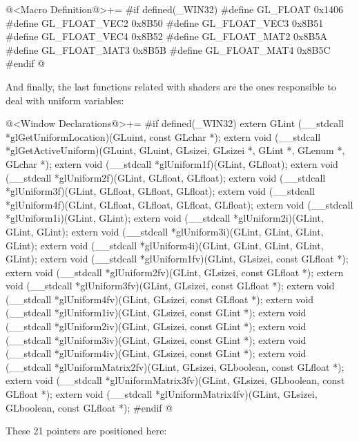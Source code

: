 \iniciocodigo
@<Macro Definition@>+=
#if defined(_WIN32)
#define GL_FLOAT      0x1406
#define GL_FLOAT_VEC2 0x8B50
#define GL_FLOAT_VEC3 0x8B51
#define GL_FLOAT_VEC4 0x8B52
#define GL_FLOAT_MAT2 0x8B5A
#define GL_FLOAT_MAT3 0x8B5B
#define GL_FLOAT_MAT4 0x8B5C
#endif
@
\fimcodigo

And finally, the last functions related with shaders are the ones
responsible to deal with uniform variables:

\iniciocodigo
@<Window Declarations@>+=
#if defined(_WIN32)
extern GLint (__stdcall *glGetUniformLocation)(GLuint, const GLchar *);
extern void (__stdcall *glGetActiveUniform)(GLuint, GLuint, GLsizei, GLsizei *,
                                            GLint *, GLenum *, GLchar *);
extern void (__stdcall *glUniform1f)(GLint, GLfloat);
extern void (__stdcall *glUniform2f)(GLint, GLfloat, GLfloat);
extern void (__stdcall *glUniform3f)(GLint, GLfloat, GLfloat, GLfloat);
extern void (__stdcall *glUniform4f)(GLint, GLfloat, GLfloat, GLfloat, GLfloat);
extern void (__stdcall *glUniform1i)(GLint, GLint);
extern void (__stdcall *glUniform2i)(GLint, GLint, GLint);
extern void (__stdcall *glUniform3i)(GLint, GLint, GLint, GLint);
extern void (__stdcall *glUniform4i)(GLint, GLint, GLint, GLint, GLint);
extern void (__stdcall *glUniform1fv)(GLint, GLsizei, const GLfloat *);
extern void (__stdcall *glUniform2fv)(GLint, GLsizei, const GLfloat *);
extern void (__stdcall *glUniform3fv)(GLint, GLsizei, const GLfloat *);
extern void (__stdcall *glUniform4fv)(GLint, GLsizei, const GLfloat *);
extern void (__stdcall *glUniform1iv)(GLint, GLsizei, const GLint *);
extern void (__stdcall *glUniform2iv)(GLint, GLsizei, const GLint *);
extern void (__stdcall *glUniform3iv)(GLint, GLsizei, const GLint *);
extern void (__stdcall *glUniform4iv)(GLint, GLsizei, const GLint *);
extern void (__stdcall *glUniformMatrix2fv)(GLint, GLsizei, GLboolean,
                                            const GLfloat *);
extern void (__stdcall *glUniformMatrix3fv)(GLint, GLsizei, GLboolean,
                                            const GLfloat *);
extern void (__stdcall *glUniformMatrix4fv)(GLint, GLsizei, GLboolean,
                                            const GLfloat *);
#endif
@
\fimcodigo

These 21 pointers are positioned here:

